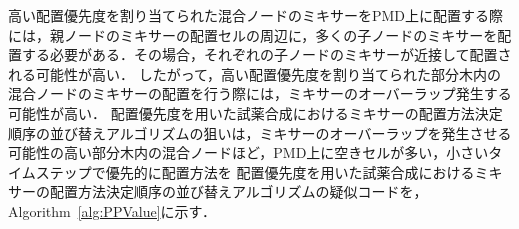 高い配置優先度を割り当てられた混合ノードのミキサーをPMD上に配置する際には，親ノードのミキサーの配置セルの周辺に，多くの子ノードのミキサーを配置する必要がある．その場合，それぞれの子ノードのミキサーが近接して配置される可能性が高い．
したがって，高い配置優先度を割り当てられた部分木内の混合ノードのミキサーの配置を行う際には，ミキサーのオーバーラップ発生する可能性が高い．
配置優先度を用いた試薬合成におけるミキサーの配置方法決定順序の並び替えアルゴリズムの狙いは，ミキサーのオーバーラップを発生させる可能性の高い部分木内の混合ノードほど，PMD上に空きセルが多い，小さいタイムステップで優先的に配置方法を
配置優先度を用いた試薬合成におけるミキサーの配置方法決定順序の並び替えアルゴリズムの疑似コードを，Algorithm~\ref{alg:PPValue}に示す．
